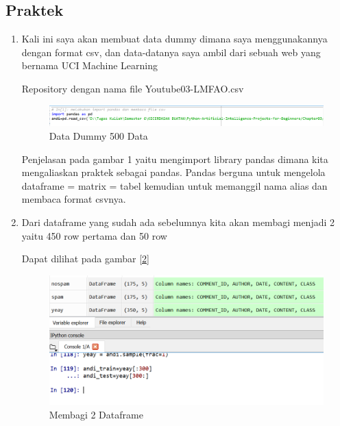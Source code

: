 \subsection{Praktek}
\begin{enumerate}
\item Kali ini saya akan membuat data dummy dimana saya menggunakannya dengan format csv, dan data-datanya saya ambil dari sebuah web yang bernama UCI Machine Learning
\par Repository dengan nama file Youtube03-LMFAO.csv
\begin{figure}[ht]
\centerline{\includegraphics[width=1\textwidth]{figures/c4P/1.PNG}}
\caption{Data Dummy 500 Data}
\label{Contoh Ilustrasi}
\end{figure}

\subitem Penjelasan pada gambar 1 yaitu mengimport library pandas dimana kita mengaliaskan praktek sebagai pandas. Pandas berguna untuk mengelola  dataframe = matrix = tabel kemudian untuk memanggil nama alias dan membaca format csvnya.
\item Dari dataframe yang sudah ada sebelumnya kita akan membagi menjadi 2 yaitu 450 row pertama dan 50 row 
\par Dapat dilihat pada gambar \ref{2}
\begin{figure}[ht]
\centerline{\includegraphics[width=1\textwidth]{figures/c4P/2.PNG}}
\caption{Membagi 2 Dataframe}
\label{Contoh Ilustrasi}
\end{figure}


\end{enumerate}
